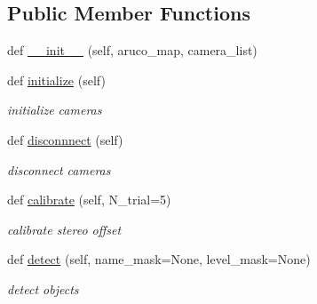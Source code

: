 \subsection*{Public Member Functions}
\begin{DoxyCompactItemize}
\item 
def \hyperlink{classrnb-planning_1_1src_1_1pkg_1_1detector_1_1aruco_1_1stereo_1_1_aruco_stereo_a1e91f693d833c520d3aef84035938616}{\+\_\+\+\_\+init\+\_\+\+\_\+} (self, aruco\+\_\+map, camera\+\_\+list)
\item 
\mbox{\label{classrnb-planning_1_1src_1_1pkg_1_1detector_1_1aruco_1_1stereo_1_1_aruco_stereo_a857c83f430522a7385152766be7e0246}} 
def \hyperlink{classrnb-planning_1_1src_1_1pkg_1_1detector_1_1aruco_1_1stereo_1_1_aruco_stereo_a857c83f430522a7385152766be7e0246}{initialize} (self)
\begin{DoxyCompactList}\small\item\em initialize cameras \end{DoxyCompactList}\item 
\mbox{\label{classrnb-planning_1_1src_1_1pkg_1_1detector_1_1aruco_1_1stereo_1_1_aruco_stereo_a4c8b2cebbca5aeca876a42f71fea17ff}} 
def \hyperlink{classrnb-planning_1_1src_1_1pkg_1_1detector_1_1aruco_1_1stereo_1_1_aruco_stereo_a4c8b2cebbca5aeca876a42f71fea17ff}{disconnnect} (self)
\begin{DoxyCompactList}\small\item\em disconnect cameras \end{DoxyCompactList}\item 
def \hyperlink{classrnb-planning_1_1src_1_1pkg_1_1detector_1_1aruco_1_1stereo_1_1_aruco_stereo_a7d271e9c3824f8e206b3b10ac253f795}{calibrate} (self, N\+\_\+trial=5)
\begin{DoxyCompactList}\small\item\em calibrate stereo offset \end{DoxyCompactList}\item 
def \hyperlink{classrnb-planning_1_1src_1_1pkg_1_1detector_1_1aruco_1_1stereo_1_1_aruco_stereo_a8ad1cc5d59b4122552df1e1fd9ea58cd}{detect} (self, name\+\_\+mask=None, level\+\_\+mask=None)
\begin{DoxyCompactList}\small\item\em detect objects \end{DoxyCompactList}\item 

\end{DoxyCompactItemize}

